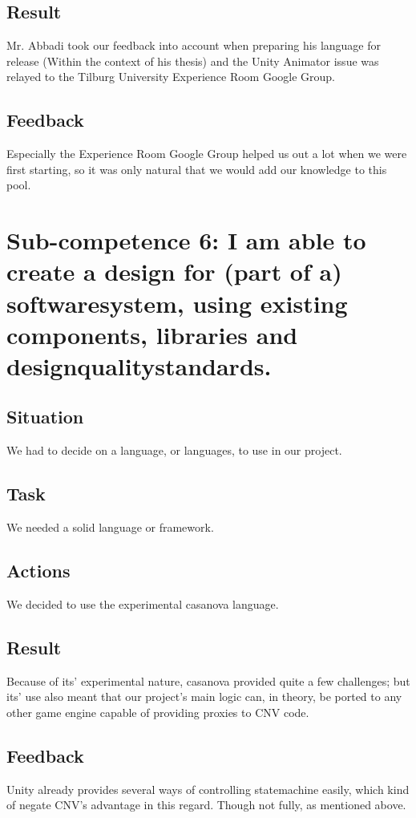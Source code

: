 \documentclass[11pt]{article}
\begin{document}
\subsection{Result}
Mr. Abbadi took our feedback into account when preparing his language for release (Within the context of his thesis) and the Unity Animator issue was relayed to the Tilburg University Experience Room Google Group.
\subsection{Feedback}
Especially the Experience Room Google Group helped us out a lot when we were first starting, so it was only natural that we would add our knowledge to this pool.


\newpage
\section{Sub-competence 6: I am able to create a design
for (part of a) softwaresystem,
using existing components,
libraries and designqualitystandards. } 
\subsection{Situation}
We had to decide on a language, or languages, to use in our project.
\subsection{Task}
We needed a solid language or framework.
\subsection{Actions}
We decided to use the experimental casanova language.
\subsection{Result}
Because of its' experimental nature, casanova provided quite a few challenges; but its' use also meant that our project's main logic can, in theory, be ported to any other game engine capable
of providing proxies to CNV code.
\subsection{Feedback}
Unity already provides several ways of controlling statemachine easily, which kind of negate CNV's advantage in this regard. Though not fully, as mentioned above.
\end{document}
